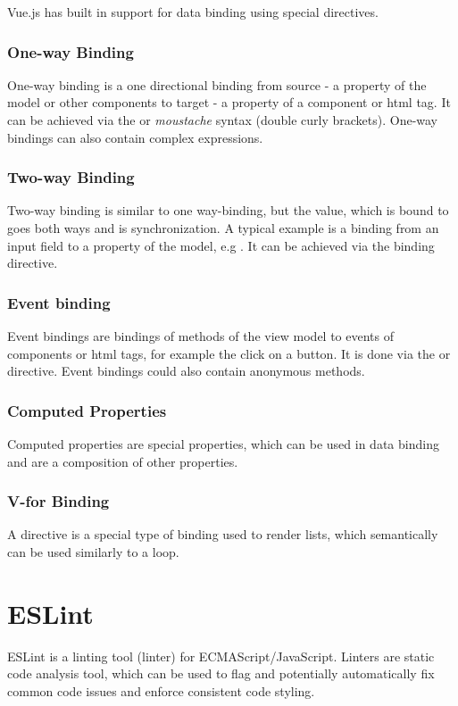 Vue.js has built in support for data binding using special directives.

\subsubsection{One-way Binding}
One-way binding is a one directional binding from source - a property of the model or other components to target - a property of a component or html tag. It can be achieved via the  or \textit{moustache} syntax (double curly brackets). One-way bindings can also contain complex expressions.

\subsubsection{Two-way Binding}
Two-way binding is similar to one way-binding, but the value, which is bound to goes both ways and is synchronization. A typical example is a binding from an input field to a property of the model, e.g . It can be achieved via the  binding directive.

\subsubsection{Event binding}
Event bindings are bindings of methods of the view model to events of components or html tags, for example the click on a button. It is done via the  or  directive. Event bindings could also contain anonymous methods.

\subsubsection{Computed Properties}
Computed properties are special properties, which can be used in data binding and are a composition of other properties. 

\subsubsection{V-for Binding}
A  directive is a special type of binding used to render lists, which semantically can be used similarly to a  loop.

\section{ESLint}

ESLint \parencite{eslintMainPage} is a linting tool (linter) for ECMAScript/JavaScript. Linters are static code analysis tool, which can be used to flag and potentially automatically fix common code issues and enforce consistent code styling.


